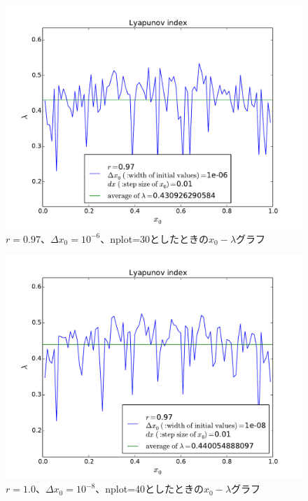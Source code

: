 \documentclass{jsarticle}
\begin{document}
\begin{enumerate}
\begin{enumerate}
                \begin{figure}[H]   
                    \begin{center}
                        \includegraphics[width=12.5cm]{figure_10.pdf}
                        \caption{$r=0.97$、$\Delta x_{0}=10^{-6}$、nplot=30としたときの$x_{0} - \lambda$グラフ}
                        \label{fig:f7}
                    \end{center}
                \end{figure}
                
                \begin{figure}[H]   
                    \begin{center}
                        \includegraphics[width=12.5cm]{figure_11.pdf}
                        \caption{$r=1.0$、$\Delta x_{0}=10^{-8}$、nplot=40としたときの$x_{0} - \lambda$グラフ}
                        \label{fig:f8}
                    \end{center}
                \end{figure}


\end{enumerate}
\end{enumerate}
\end{document}
